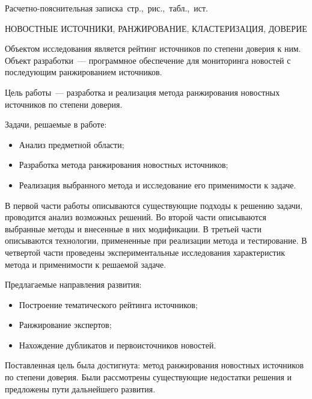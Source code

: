 \Referat

Расчетно-пояснительная записка \pageref{LastPage}\,стр., \totfig{}\,рис., \tottab{}\,табл., \,ист.

НОВОСТНЫЕ ИСТОЧНИКИ, РАНЖИРОВАНИЕ, КЛАСТЕРИЗАЦИЯ, ДОВЕРИЕ

Объектом исследования является рейтинг источников по степени доверия к ним. Объект разработки~--- программное обеспечение для мониторинга новостей с последующим ранжированием источников.

Цель работы~--- разработка и реализация метода ранжирования новостных источников по степени доверия.

Задачи, решаемые в работе:
\begin{itemize}
    \item Анализ предметной области;
    \item Разработка метода ранжирования новостных источников;
    \item Реализация выбранного метода и исследование его применимости к задаче.
\end{itemize}

В первой части работы описываются существующие подходы к решению задачи, проводится анализ возможных решений. Во второй части описываются выбранные методы и внесенные в них модификации. В третьей части описываются технологии, примененные при реализации метода и тестирование. В четвертой части проведены экспериментальные исследования характеристик метода и применимости к решаемой задаче.

Предлагаемые направления развития:
\begin{itemize}
    \item Построение тематического рейтинга источников;
    \item Ранжирование экспертов;
    \item Нахождение дубликатов и первоисточников новостей.
\end{itemize}

Поставленная цель была достигнута: метод ранжирования новостных источников по степени доверия. Были рассмотрены существующие недостатки решения и предложены пути
дальнейшего развития.
